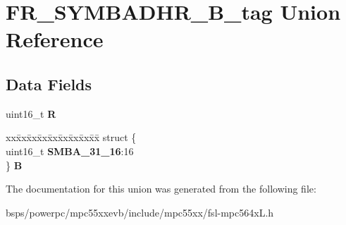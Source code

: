 \hypertarget{unionFR__SYMBADHR__16B__tag}{}\section{F\+R\+\_\+\+S\+Y\+M\+B\+A\+D\+H\+R\+\_\+B\+\_\+tag Union Reference}
\label{unionFR__SYMBADHR__16B__tag}
\subsection*{Data Fields}
\begin{DoxyCompactItemize}
\item 
\mbox{\label{unionFR__SYMBADHR__16B__tag_a8c9ad14c1fcce25f8ccb8589c82b5954}} 
uint16\+\_\+t {\bfseries R}
\item 
\mbox{\label{unionFR__SYMBADHR__16B__tag_aac0b100ef9a3c36e615b5146521360a7}} 
\begin{tabbing}
xx\=xx\=xx\=xx\=xx\=xx\=xx\=xx\=xx\=\kill
struct \{\\
\>uint16\_t {\bfseries SMBA\_31\_16}:16\\
\} {\bfseries B}\\

\end{tabbing}\end{DoxyCompactItemize}


The documentation for this union was generated from the following file\+:\begin{DoxyCompactItemize}
\item 
bsps/powerpc/mpc55xxevb/include/mpc55xx/fsl-\/mpc564x\+L.\+h\end{DoxyCompactItemize}
